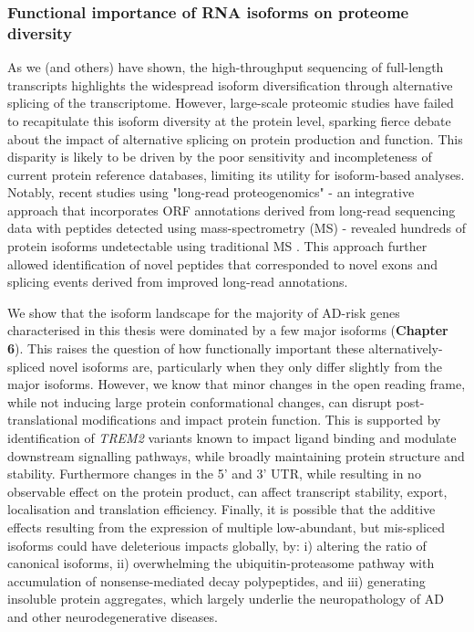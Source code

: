 \subsubsection{Functional importance of RNA isoforms on proteome diversity} 
As we (and others) have shown, the high-throughput sequencing of full-length transcripts highlights the widespread isoform diversification through alternative splicing of the transcriptome. However, large-scale proteomic studies have failed to recapitulate this isoform diversity at the protein level, sparking fierce debate about the impact of alternative splicing on protein production and function\cite{Tress2017a,Blencowe2017,Tress2017b}. This disparity is likely to be driven by the poor sensitivity and incompleteness of current protein reference databases, limiting its utility for isoform-based analyses\cite{Reixachs-Sole2022}. Notably, recent studies using "long-read proteogenomics" - an integrative approach that incorporates ORF annotations derived from long-read sequencing data with peptides detected using mass-spectrometry (MS) - revealed hundreds of protein isoforms undetectable using traditional MS \cite{Miller2022,Wang2019a}. This approach further allowed identification of novel peptides that corresponded to novel exons and splicing events derived from improved long-read annotations\cite{Miller2022,KayLeung2021}.  

We show that the isoform landscape for the majority of AD-risk genes characterised in this thesis were dominated by a few major isoforms (\textbf{Chapter 6}). This raises the question of how functionally important these alternatively-spliced novel isoforms are, particularly when they only differ slightly from the major isoforms. However, we know that minor changes in the open reading frame, while not inducing large protein conformational changes, can disrupt post-translational modifications and impact protein function\cite{Reixachs-Sole2022}. This is supported by identification of \textit{TREM2} variants known to impact ligand binding and modulate downstream signalling pathways, while broadly maintaining protein structure and stability\cite{Kober2016}. Furthermore changes in the 5' and 3' UTR, while resulting in no observable effect on the protein product, can affect transcript stability, export, localisation and translation efficiency\cite{Reixachs-Sole2022}. Finally, it is possible that the additive effects resulting from the expression of multiple low-abundant, but mis-spliced isoforms could have deleterious impacts globally, by: i) altering the ratio of canonical isoforms, ii) overwhelming the ubiquitin-proteasome pathway with accumulation of nonsense-mediated decay polypeptides, and iii) generating insoluble protein aggregates, which largely underlie the neuropathology of AD and other neurodegenerative diseases\cite{Davis2018}.

